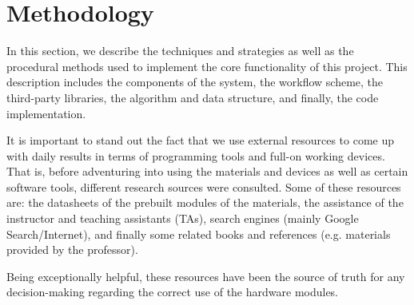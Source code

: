 %
%
%


\section{Methodology}
In this section, we describe the techniques and strategies as well as the procedural methods used to implement the core functionality of this project. This description includes the components of the system, the workflow scheme, the third-party libraries, the algorithm and data structure, and finally, the code implementation.

It is important to stand out the fact that we use external resources to come up with daily results in terms of programming tools and full-on working devices. That is, before adventuring into using the materials and devices as well as certain software tools, different research sources were consulted. Some of these resources are: the datasheets of the prebuilt modules of the materials, the assistance of the instructor and teaching assistants (TAs), search engines (mainly Google Search/Internet), and finally some related books and references (e.g. materials provided by the professor).

Being exceptionally helpful, these resources have been the source of truth for any decision-making regarding the correct use of the hardware modules.

